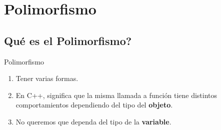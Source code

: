 \section{Polimorfismo}
\subsection{\textquestiondown Qu\'e es el Polimorfismo?}
\begin{frame}{Polimorfismo}{}
   \begin{enumerate}
      \item Tener varias formas.
      \item En C++, significa que la misma llamada a funci\'on tiene distintos comportamientos dependiendo del tipo del \textbf{objeto}.
      \item No queremos que dependa del tipo de la \textbf{variable}.
   \end{enumerate}
\end{frame}

